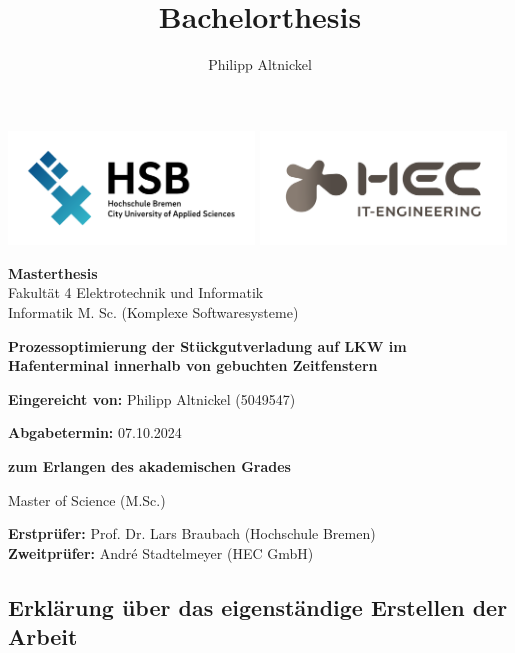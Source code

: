 \vfill\documentclass[12pt]{extarticle}
\title{Bachelorthesis}
\author{Philipp Altnickel}
\begin{document}
\begin{titlepage}
	\centering
	\includegraphics[width=0.49\textwidth]{Logo_HSB_Hochschule_Bremen.png}
	\includegraphics[width=0.49\textwidth]{Logo_HEC.png}
	\par
	\vspace{2cm}
	{\large \textbf{Masterthesis}\\Fakultät 4 Elektrotechnik und Informatik\\Informatik M. Sc. (Komplexe Softwaresysteme)\par}
	\vspace{2cm}
	{\LARGE\bfseries Prozessoptimierung der Stückgutverladung auf LKW im Hafenterminal innerhalb von gebuchten Zeitfenstern\par}
	\vspace{3cm}
	{\large \textbf{Eingereicht von:} Philipp Altnickel (5049547)\par}
	{\large \textbf{Abgabetermin:} 07.10.2024\par}
	\vspace{1cm}
	{\large \bfseries zum Erlangen des akademischen Grades\par\LARGE Master of Science (M.Sc.)\par}
	
	\vfill
	
	{\large \textbf{Erstprüfer:} Prof. Dr. Lars Braubach (Hochschule Bremen)\\\textbf{Zweitprüfer:} André Stadtelmeyer (HEC GmbH)\par}
\end{titlepage}
\newpage

\setcounter{page}{2}

\subsection*{Erklärung über das eigenständige Erstellen der Arbeit}
\end{document}
